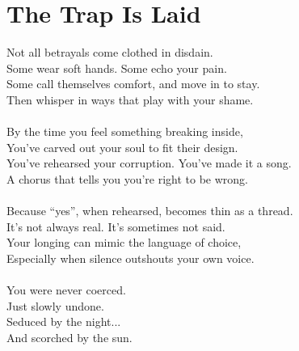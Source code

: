 \part{The Trap Is Laid}

\vfill

\begin{flushright}
  \Large
  Not all betrayals come clothed in disdain.\\
  Some wear soft hands. Some echo your pain.\\
  Some call themselves comfort, and move in to stay.\\
  Then whisper in ways that play with your shame.\\
  \ \\
  By the time you feel something breaking inside,\\
  You’ve carved out your soul to fit their design.\\
  You’ve rehearsed your corruption. You’ve made it a song.\\
  A chorus that tells you you’re right to be wrong.\\
  \ \\
  Because ``yes'', when rehearsed, becomes thin as a thread.\\
  It’s not always real. It’s sometimes not said.\\
  Your longing can mimic the language of choice,\\
  Especially when silence outshouts your own voice.\\
  \ \\
  You were never coerced.\\
  Just slowly undone.\\
  Seduced by the night...\\
  And scorched by the sun.\\
  \end{flushright}


